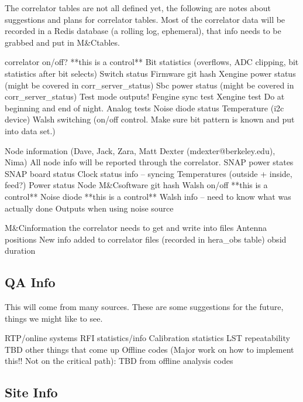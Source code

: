 \documentclass{article}
\newcommand{\mc}{M\&C}
\begin{document}
The correlator tables are not all defined yet, the following are notes about suggestions and plans for correlator tables. Most of the correlator data will be recorded in a Redis database (a rolling log, ephemeral), that info needs to be grabbed and put in \mc tables.
\begin{outline}[enumerate]
	\1 correlator on/off?	**this is a control**
	\1 Bit statistics (overflows, ADC clipping, bit statistics after bit selects)
	\1 Switch status
	\1 Firmware git hash
	\1 Xengine power status (might be covered in corr\_server\_status)
	\1 Sbc power status (might be covered in corr\_server\_status)
	\1 Test mode outputs!
		\2 Fengine sync test
		\2 Xengine test
		\2 Do at beginning and end of night.
		\2 Analog tests
			\3 Noise diode status
			\3 Temperature (i2c device)
			\3 Walsh switching (on/off control. Make sure bit pattern is known and put into data set.)

	\1 Node information (Dave, Jack, Zara, Matt Dexter (mdexter@berkeley.edu), Nima) All node info will be reported through the correlator.
		\2 SNAP power states
		\2 SNAP board status
		\2 Clock status info -- syncing
		\2 Temperatures (outside + inside, feed?)
		\2 Power status
		\2 Node \mc software git hash
		\2 Walsh on/off	**this is a control**
		\2 Noise diode	**this is a control**
		\2 Walsh info -- need to know what was actually done
		\2 Outputs when using noise source

	\1 \mc information the correlator needs to get and write into files
		\2 Antenna positions
	\1 New info added to correlator files (recorded in hera\_obs table)
		\2 obsid
		\2 duration
\end{outline}

\subsection{QA Info}
This will come from many sources. These are some suggestions for the future, things we might like to see.

\begin{outline}[enumerate]
	\1 RTP/online systems
		\2 RFI statistics/info
		\2 Calibration statistics
		\2 LST repeatability
		\2 TBD other things that come up
	\1 Offline codes (Major work on how to implement this!! Not on the critical path):
		\2 TBD from offline analysis codes
\end{outline}

\subsection{Site Info}
\end{document}
